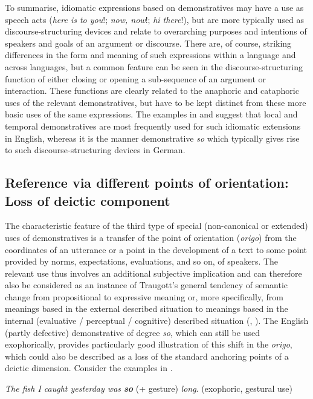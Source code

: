 \documentclass[output=paper,colorlinks,citecolor=brown]{langscibook}
\begin{document}
To summarise, idiomatic expressions based on demonstratives may have a use as speech acts (\textit{here is to you}!; \textit{now, now}!; \textit{hi there}!), but are more typically used as discourse-structuring devices and relate to overarching purposes and intentions of speakers and goals of an argument or discourse. There are, of course, striking differences in the form and meaning of such expressions within a language and across languages, but a common feature can be seen in the discourse-structuring function of either closing or opening a sub-sequence of an argument or interaction. These functions are clearly related to the anaphoric and cataphoric uses of the relevant demonstratives, but have to be kept distinct from these more basic uses of the same expressions. The examples in  and  suggest that local and temporal demonstratives are most frequently used for such idiomatic extensions in English, whereas it is the manner demonstrative \textit{so} which typically gives rise to such discourse-structuring devices in German.

\subsection{Reference via different points of orientation: Loss of deictic component}

The characteristic feature of the third type of special (non-canonical or extended) uses of demonstratives is a transfer of the point of orientation (\textit{origo}) from the coordinates of an utterance or a point in the development of a text to some point provided by norms, expectations, evaluations, and so on, of speakers. The relevant use thus involves an additional subjective implication and can therefore also be considered as an instance of Traugott’s general tendency of semantic change from propositional to expressive meaning or, more specifically, from meanings based in the external described situation to meanings based in the internal (evaluative / perceptual / cognitive) described situation (\citealt{Traugott1982}, \citeyear{Traugott1990}). The English (partly defective) demonstrative of degree \textit{so}, which can still be used exophorically, provides particularly good illustration of this shift in the \textit{origo}, which could also be described as a loss of the standard anchoring points of a deictic dimension. Consider the examples in .

\ea\label{ex:koenig:14}
\ea\label{ex:koenig:14a} \textit{The fish I caught yesterday was \textbf{so}} (+ gesture) \textit{long}. \newline (exophoric, gestural use)\\
\end{document}
